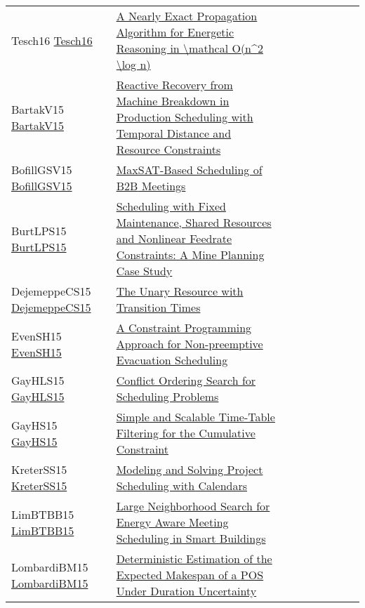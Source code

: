 {\begin{longtable}{p{3cm}p{7cm}lllllll}
Tesch16 \href{https://doi.org/10.1007/978-3-319-44953-1\_32}{Tesch16} &  \href{papers/Tesch16.pdf}{A Nearly Exact Propagation Algorithm for Energetic Reasoning in {\textbackslash}mathcal O(n{\^{}}2 {\textbackslash}log n)} &  &  &  &  &  &  & \\
BartakV15 \href{}{BartakV15} &  \href{}{Reactive Recovery from Machine Breakdown in Production Scheduling with Temporal Distance and Resource Constraints} &  &  &  &  &  &  & \\
BofillGSV15 \href{https://doi.org/10.1007/978-3-319-18008-3\_5}{BofillGSV15} &  \href{papers/BofillGSV15.pdf}{MaxSAT-Based Scheduling of {B2B} Meetings} &  &  &  &  &  &  & \\
BurtLPS15 \href{https://doi.org/10.1007/978-3-319-18008-3\_7}{BurtLPS15} &  \href{papers/BurtLPS15.pdf}{Scheduling with Fixed Maintenance, Shared Resources and Nonlinear Feedrate Constraints: {A} Mine Planning Case Study} &  &  &  &  &  &  & \\
DejemeppeCS15 \href{https://doi.org/10.1007/978-3-319-23219-5\_7}{DejemeppeCS15} &  \href{papers/DejemeppeCS15.pdf}{The Unary Resource with Transition Times} &  &  &  &  &  &  & \\
EvenSH15 \href{https://doi.org/10.1007/978-3-319-23219-5\_40}{EvenSH15} &  \href{papers/EvenSH15.pdf}{A Constraint Programming Approach for Non-preemptive Evacuation Scheduling} &  &  &  &  &  &  & \\
GayHLS15 \href{https://doi.org/10.1007/978-3-319-23219-5\_10}{GayHLS15} &  \href{papers/GayHLS15.pdf}{Conflict Ordering Search for Scheduling Problems} &  &  &  &  &  &  & \\
GayHS15 \href{https://doi.org/10.1007/978-3-319-23219-5\_11}{GayHS15} &  \href{papers/GayHS15.pdf}{Simple and Scalable Time-Table Filtering for the Cumulative Constraint} &  &  &  &  &  &  & \\
KreterSS15 \href{https://doi.org/10.1007/978-3-319-23219-5\_19}{KreterSS15} &  \href{papers/KreterSS15.pdf}{Modeling and Solving Project Scheduling with Calendars} &  &  &  &  &  &  & \\
LimBTBB15 \href{https://doi.org/10.1007/978-3-319-18008-3\_17}{LimBTBB15} &  \href{papers/LimBTBB15.pdf}{Large Neighborhood Search for Energy Aware Meeting Scheduling in Smart Buildings} &  &  &  &  &  &  & \\
LombardiBM15 \href{https://doi.org/10.1007/978-3-319-23219-5\_20}{LombardiBM15} &  \href{papers/LombardiBM15.pdf}{Deterministic Estimation of the Expected Makespan of a {POS} Under Duration Uncertainty} &  &  &  &  &  &  & \\

\end{longtable}}
